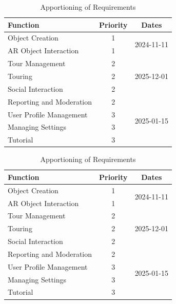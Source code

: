 \documentclass{article}
\begin{document}
\begin{table}[]
\caption{Apportioning of Requirements}
\label{tab:apportioning_table}
\centering
\begin{tabular}{lcc}
    \toprule
        \textbf{Function} & \textbf{Priority} & \textbf{Dates} \\
    \hline \hline
Object Creation          & 1 & \multirow{2}{*}{2024-11-11} \\
AR Object Interaction    & 1 &                             \\ \hline
Tour Management          & 2 & \multirow{3}{*}{2025-12-01} \\
Touring                  & 2 & \\
Social Interaction       & 2 &                             \\
Reporting and Moderation & 2 & \multirow{4}{*}{2025-01-15} \\ \hline
User Profile Management  & 3 &                             \\
Managing Settings        & 3 &                             \\
Tutorial                 & 3 &                             \\
    \hline
\end{tabular}
\end{table}


\begin{table}[]
    \caption{Apportioning of Requirements}
    \label{tab:apportioning_table}
    \centering
    \begin{tabular}{lcc}
        \toprule
            \textbf{Function} & \textbf{Priority} & \textbf{Dates} \\
        \hline \hline
    Object Creation          & 1 & \multirow{2}{*}{2024-11-11} \\
    AR Object Interaction    & 1 &                             \\ \hline
    Tour Management          & 2 & \multirow{3}{*}{2025-12-01} \\
    Touring                  & 2 & \\
    Social Interaction       & 2 &                             \\
    Reporting and Moderation & 2 & \multirow{4}{*}{2025-01-15} \\ \hline
    User Profile Management  & 3 &                             \\
    Managing Settings        & 3 &                             \\
    Tutorial                 & 3 &                             \\
        \hline
    \end{tabular}
\end{table}
\end{document}

